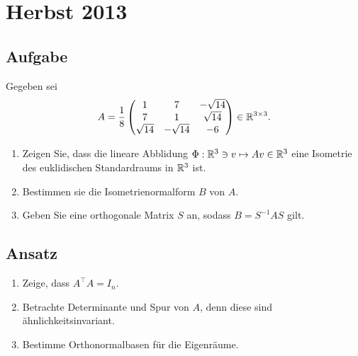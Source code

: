 \newpage

\section{Herbst  2013}

\subsection{Aufgabe}
Gegeben sei
\begin{equation*}
	A = \frac{1}{8}\begin{pmatrix}
		1 & 7 & -\sqrt{14} \\
		7 & 1 & \sqrt{14} \\
		\sqrt{14} & -\sqrt{14} & -6
	\end{pmatrix} \in \mathbb{R}^{3 \times 3}\text{.}
\end{equation*}
\begin{enumerate}
	\item Zeigen Sie, dass die lineare Abblidung \( \Phi: \mathbb{R}^3 \ni v \mapsto Av \in \mathbb{R}^3 \) eine Isometrie des euklidischen Standardraums in \( \mathbb{R}^3 \) ist.
	\item Bestimmen sie die Isometrienormalform \( B \) von \( A \).
	\item Geben Sie eine orthogonale Matrix \( S \) an, sodass \( B = S^{-1}AS \) gilt. 
\end{enumerate}

\subsection{Ansatz}
\begin{enumerate}
	\item Zeige, dass \( A^\top A=I_n \). 
	\item Betrachte Determinante und Spur von \( A \), denn diese sind ähnlichkeitsinvariant.
	\item Bestimme Orthonormalbasen für die Eigenräume.
\end{enumerate}

